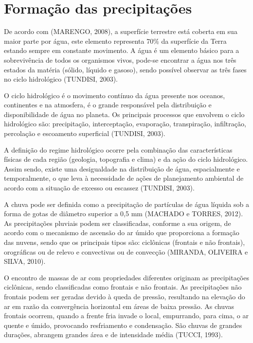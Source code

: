 \section{Formação das precipitações}

De acordo com (MARENGO, 2008), a superfície terrestre está coberta em sua maior parte por água, este elemento representa 70\% da superfície da Terra estando sempre em constante movimento. A água é um elemento básico para a sobrevivência de todos os organismos vivos, pode-se encontrar a água nos três estados da matéria (sólido, líquido e gasoso), sendo possível observar as três fases no ciclo hidrológico (TUNDISI, 2003).

O ciclo hidrológico é o movimento contínuo da água presente nos oceanos, continentes e na atmosfera, é o grande responsável pela distribuição e disponibilidade de água no planeta. Os principais processos que envolvem o ciclo hidrológico são: precipitação, interceptação, evaporação, transpiração, infiltração, percolação e escoamento superficial (TUNDISI, 2003).

A definição do regime hidrológico ocorre pela combinação das características físicas de cada região (geologia, topografia e clima) e da ação do ciclo hidrológico. Assim sendo, existe uma desigualdade na distribuição de água, espacialmente e temporalmente, o que leva à necessidade de ações de planejamento ambiental de acordo com a situação de excesso ou escassez (TUNDISI, 2003).

A chuva pode ser definida como a precipitação de partículas de água líquida sob a forma de gotas de diâmetro superior a 0,5 mm (MACHADO e TORRES, 2012). As precipitações pluviais podem ser classificadas, conforme a sua origem, de acordo com o mecanismo de ascensão do ar úmido que proporciona a formação das nuvens, sendo que os principais tipos são: ciclônicas (frontais e não frontais), orográficas ou de relevo e convectivas ou de convecção (MIRANDA, OLIVEIRA e SILVA, 2010).

O encontro de massas de ar com propriedades diferentes originam as precipitações ciclônicas, sendo classificadas como frontais e não frontais. As precipitações não frontais podem ser geradas devido à queda de pressão, resultando na elevação do ar em razão da convergência horizontal em áreas de baixa pressão. As chuvas frontais ocorrem, quando a frente fria invade o local, empurrando, para cima, o ar quente e úmido, provocando resfriamento e condensação. São chuvas de grandes durações, abrangem grandes área e de intensidade média (TUCCI, 1993).

